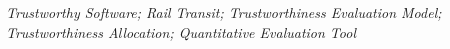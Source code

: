 \vspace{0.5cm}
{} \textit{Trustworthy Software; Rail Transit; Trustworthiness Evaluation Model; Trustworthiness Allocation; Quantitative Evaluation Tool}


































